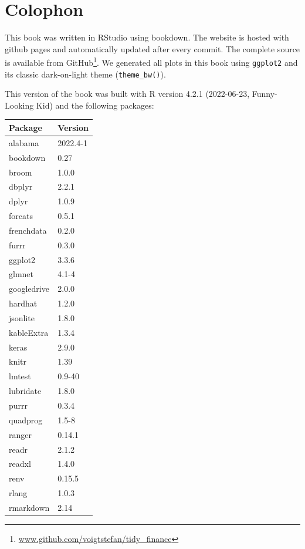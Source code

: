 \documentclass[
]{book}
\renewcommand{\href}[2]{#2\footnote{\url{#1}}}
\begin{document}
\hypertarget{colophon}{%
\section*{Colophon}\label{colophon}}


This book was written in RStudio using bookdown. The website is hosted with github pages and automatically updated after every commit. The complete source is \href{www.github.com/voigtstefan/tidy_finance}{available from GitHub}.
We generated all plots in this book using \texttt{ggplot2} and its classic dark-on-light theme (\texttt{theme\_bw()}).

This version of the book was built with R version 4.2.1 (2022-06-23, Funny-Looking Kid) and the following packages:

\begin{tabular}[t]{l|l}
\hline
Package & Version\\
\hline
alabama & 2022.4-1\\
\hline
bookdown & 0.27\\
\hline
broom & 1.0.0\\
\hline
dbplyr & 2.2.1\\
\hline
dplyr & 1.0.9\\
\hline
forcats & 0.5.1\\
\hline
frenchdata & 0.2.0\\
\hline
furrr & 0.3.0\\
\hline
ggplot2 & 3.3.6\\
\hline
glmnet & 4.1-4\\
\hline
googledrive & 2.0.0\\
\hline
hardhat & 1.2.0\\
\hline
jsonlite & 1.8.0\\
\hline
kableExtra & 1.3.4\\
\hline
keras & 2.9.0\\
\hline
knitr & 1.39\\
\hline
lmtest & 0.9-40\\
\hline
lubridate & 1.8.0\\
\hline
purrr & 0.3.4\\
\hline
quadprog & 1.5-8\\
\hline
ranger & 0.14.1\\
\hline
readr & 2.1.2\\
\hline
readxl & 1.4.0\\
\hline
renv & 0.15.5\\
\hline
rlang & 1.0.3\\
\hline
rmarkdown & 2.14\\

\end{tabular}
\end{document}
